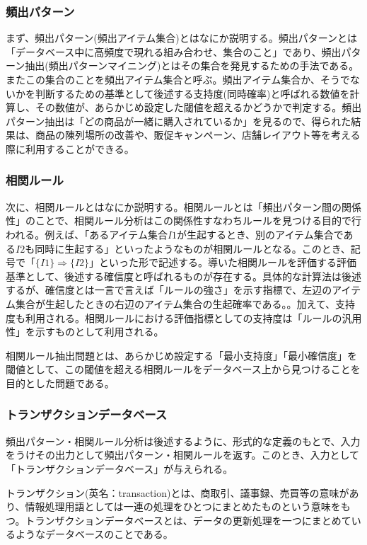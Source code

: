 \documentclass[dvipdfmx]{jsarticle}
\begin{document}
\subsubsection{頻出パターン}
まず、頻出パターン(頻出アイテム集合)とはなにか説明する。頻出パターンとは「データベース中に高頻度で現れる組み合わせ、集合のこと」であり、頻出パターン抽出(頻出パターンマイニング)とはその集合を発見するための手法である。またこの集合のことを頻出アイテム集合と呼ぶ。頻出アイテム集合か、そうでないかを判断するための基準として後述する支持度(同時確率)と呼ばれる数値を計算し、その数値が、あらかじめ設定した閾値を超えるかどうかで判定する。頻出パターン抽出は「どの商品が一緒に購入されているか」を見るので、得られた結果は、商品の陳列場所の改善や、販促キャンペーン、店舗レイアウト等を考える際に利用することができる。\par
\subsubsection{相関ルール}
次に、相関ルールとはなにか説明する。相関ルールとは「頻出パターン間の関係性」のことで、相関ルール分析はこの関係性すなわちルールを見つける目的で行われる。例えば、「あるアイテム集合$I1$が生起するとき、別のアイテム集合である$I2$も同時に生起する」といったようなものが相関ルールとなる。このとき、記号で「$\{I1\} \Rightarrow \{I2\}$」といった形で記述する。導いた相関ルールを評価する評価基準として、後述する確信度と呼ばれるものが存在する。具体的な計算法は後述するが、確信度とは一言で言えば「ルールの強さ」を示す指標で、左辺のアイテム集合が生起したときの右辺のアイテム集合の生起確率である。。加えて、支持度も利用される。相関ルールにおける評価指標としての支持度は「ルールの汎用性」を示すものとして利用される。\par
相関ルール抽出問題とは、あらかじめ設定する「最小支持度」「最小確信度」を閾値として、この閾値を超える相関ルールをデータベース上から見つけることを目的とした問題である。
\subsubsection{トランザクションデータベース}
頻出パターン・相関ルール分析は後述するように、形式的な定義のもとで、入力をうけその出力として頻出パターン・相関ルールを返す。このとき、入力として「トランザクションデータベース」が与えられる。\par
トランザクション(英名：transaction)とは、商取引、議事録、売買等の意味があり、情報処理用語としては一連の処理をひとつにまとめたものという意味をもつ。トランザクションデータベースとは、データの更新処理を一つにまとめているようなデータベースのことである。
\end{document}
